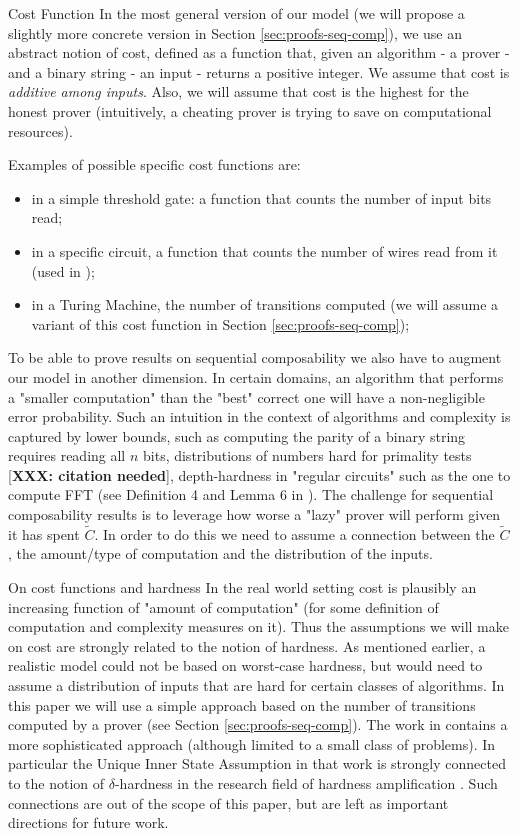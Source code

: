 {\sc Cost Function}
In the most general version of our model (we will propose a slightly more concrete version in Section \ref{sec:proofs-seq-comp}), we use an abstract notion of cost, defined
as a function that, given an algorithm - a prover - and a binary string - an input - returns a positive integer.
We assume that cost is \textit{additive among inputs}. Also, we will assume that cost is the highest for the honest prover
(intuitively, a cheating prover is trying to save on computational resources). 

Examples of possible specific cost functions are:
\begin{itemize}
	\item in a simple threshold gate: a function that counts the number of input bits read;
	\item in a specific circuit, a function that counts the number of wires read from it (used in \cite{cg15});
	\item in a Turing Machine, the number of transitions computed (we will assume a variant of this cost function in Section \ref{sec:proofs-seq-comp});
\end{itemize} 


To be  able to prove results on sequential composability we also have to augment our model in another dimension.
In certain domains, an algorithm that performs a "smaller computation" than the "best" correct one will have  a non-negligible error probability.
Such an intuition in the context of algorithms and complexity is captured by lower bounds, such as
computing the parity of a binary string requires reading all $n$ bits,
distributions of numbers hard for primality tests [\textbf{XXX: citation needed}],
depth-hardness in "regular circuits" such as the one to compute FFT (see Definition 4 and Lemma 6 in \cite{cg15}).
The challenge for sequential composability results is to leverage how worse a "lazy" prover will perform
given it has spent $\tilde{C}$. In order to do this we need to assume a connection between the
$\tilde{C}$, the amount/type of computation and the distribution of the inputs.

{\sc On cost functions and hardness}
In the real world  setting cost is plausibly an increasing function of "amount of computation" (for some definition of computation and complexity measures on it).
Thus the assumptions we will make on cost are strongly related to the notion of hardness.
As mentioned earlier, a realistic model could not be based on worst-case hardness, but would need to assume 
a distribution of inputs that are hard  for certain classes of algorithms.
In this paper we will use a simple approach based on the number of transitions computed by a prover (see Section \ref{sec:proofs-seq-comp}). 
The work in \cite{cg15} contains a more sophisticated approach (although limited to a small class of problems).
In particular the Unique Inner State Assumption in that work is strongly connected to the notion of
$\delta$-hardness in the research field of hardness amplification \cite{arora2009computational}.
Such connections are out of the scope of this paper, but are left as important directions for future work.

